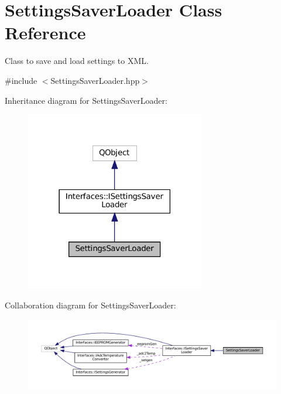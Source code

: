 \hypertarget{class_settings_saver_loader}{}\section{Settings\+Saver\+Loader Class Reference}
\label{class_settings_saver_loader}


Class to save and load settings to X\+ML.  




{\ttfamily \#include $<$Settings\+Saver\+Loader.\+hpp$>$}



Inheritance diagram for Settings\+Saver\+Loader\+:\nopagebreak
\begin{figure}[H]
\begin{center}
\leavevmode
\includegraphics[width=222pt]{class_settings_saver_loader__inherit__graph}
\end{center}
\end{figure}


Collaboration diagram for Settings\+Saver\+Loader\+:\nopagebreak
\begin{figure}[H]
\begin{center}
\leavevmode
\includegraphics[width=350pt]{class_settings_saver_loader__coll__graph}
\end{center}
\end{figure}
